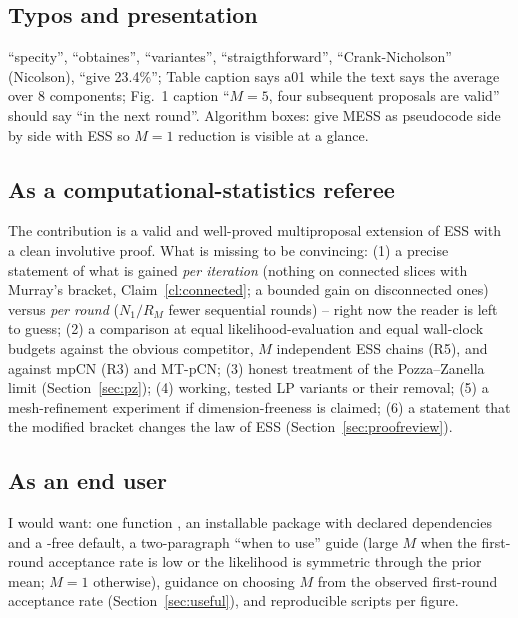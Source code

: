 \documentclass[11pt,a4paper]{article}
\theoremstyle{remark}
\begin{document}
\subsection{Typos and presentation}
``specity'', ``obtaines'', ``variantes'', ``straigthforward'', ``Crank-Nicholson'' (Nicolson), ``give 23.4\%''; Table caption says a01 while the text says the average over 8 components; Fig.~1 caption ``$M=5$, four subsequent proposals are valid'' should say ``in the next round''. Algorithm boxes: give MESS as pseudocode side by side with ESS so $M=1$ reduction is visible at a glance.

\subsection{As a computational-statistics referee}
The contribution is a valid and well-proved multiproposal extension of ESS with a clean involutive proof. What is missing to be convincing: (1) a precise statement of what is gained \emph{per iteration} (nothing on connected slices with Murray's bracket, Claim~\ref{cl:connected}; a bounded gain on disconnected ones) versus \emph{per round} ($N_1/R_M$ fewer sequential rounds) -- right now the reader is left to guess; (2) a comparison at equal likelihood-evaluation and equal wall-clock budgets against the obvious competitor, $M$ independent ESS chains (R5), and against mpCN (R3) and MT-pCN; (3) honest treatment of the Pozza--Zanella limit (Section~\ref{sec:pz}); (4) working, tested LP variants or their removal; (5) a mesh-refinement experiment if dimension-freeness is claimed; (6) a statement that the modified bracket changes the law of ESS (Section~\ref{sec:proofreview}).

\subsection{As an end user}
I would want: one function , an installable package with declared dependencies and a -free default, a two-paragraph ``when to use'' guide (large $M$ when the first-round acceptance rate is low or the likelihood is symmetric through the prior mean; $M=1$ otherwise), guidance on choosing $M$ from the observed first-round acceptance rate (Section~\ref{sec:useful}), and reproducible scripts per figure.

\end{document}
